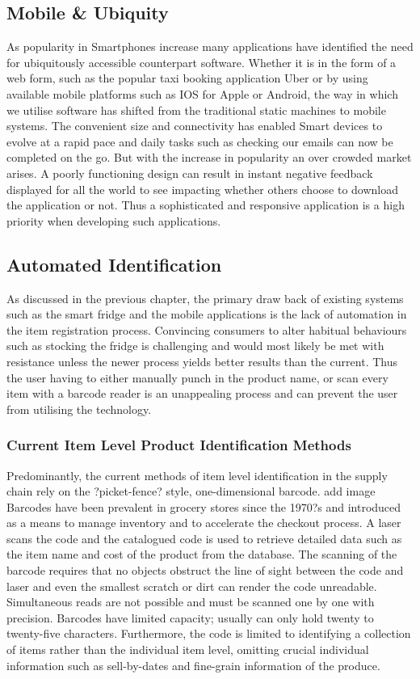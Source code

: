 \documentclass[a4paper, 11pt]{article}
\begin{document}
\subsection{Mobile \& Ubiquity}
As popularity in Smartphones increase many applications have identified the need for ubiquitously accessible counterpart software. Whether it is in the form of a web form, such as the popular taxi booking application Uber or by using available mobile platforms such as IOS for Apple or Android, the way in which we utilise software has shifted from the traditional static machines to mobile systems. The convenient size and connectivity has enabled Smart devices to evolve at a rapid pace and daily tasks such as checking our emails can now be completed on the go. But with the increase in popularity an over crowded market arises. A poorly functioning design can result in instant negative feedback displayed for all the world to see impacting whether others choose to download the application or not. Thus a sophisticated and responsive application is a high priority when developing such applications. 

\subsection{Automated Identification}
As discussed in the previous chapter, the primary draw back of existing systems such as the smart fridge and the mobile applications is the lack of automation in the item registration process. Convincing consumers to alter habitual behaviours such as stocking the fridge is challenging and would most likely be met with resistance unless the newer process yields better results than the current. Thus the user having to either manually punch in the product name, or scan every item with a barcode reader is an unappealing process and can prevent the user from utilising the technology. 


\subsubsection{Current Item Level Product Identification Methods} 
Predominantly, the current methods of item level identification in the supply chain rely on the ?picket-fence? style, one-dimensional barcode. add image Barcodes have been prevalent in grocery stores since the 1970?s and introduced as a means to manage inventory and to accelerate the checkout process. A laser scans the code and the catalogued code is used to retrieve detailed data such as the item name and cost of the product from the database. The scanning of the barcode requires that no objects obstruct the line of sight between the code and laser and even the smallest scratch or dirt can render the code unreadable. Simultaneous reads are not possible and must be scanned one by one with precision. Barcodes have limited capacity; usually can only hold twenty to twenty-five characters. Furthermore, the code is limited to identifying a collection of items rather than the individual item level, omitting crucial individual information such as sell-by-dates and fine-grain information of the produce. 
\end{document}

